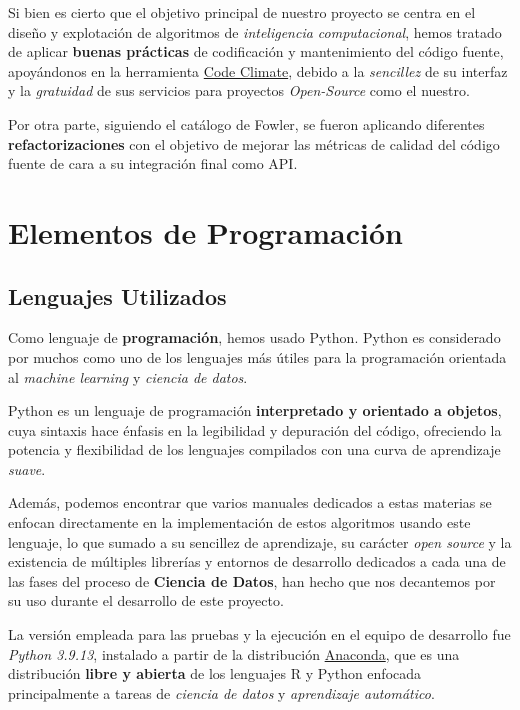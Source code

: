 Si bien es cierto que el objetivo principal de nuestro proyecto se centra en el diseño y explotación de algoritmos de \textit{inteligencia computacional}, hemos tratado de aplicar \textbf{buenas prácticas} de codificación y mantenimiento del código fuente, apoyándonos en la herramienta \href{https://codeclimate.com/github/jesgararm/GestorQuirofanos}{Code Climate}, debido a la \textit{sencillez} de su interfaz y la \textit{gratuidad} de sus servicios para proyectos \textit{Open-Source} como el nuestro.

Por otra parte, siguiendo el catálogo de Fowler\cite{Fowler1999Refactoring:Code}, se fueron aplicando diferentes \textbf{refactorizaciones} con el objetivo de mejorar las métricas de calidad del código fuente de cara a su integración final como API.


\section{Elementos de Programación}

\subsection{Lenguajes Utilizados}

Como lenguaje de \textbf{programación}, hemos usado Python\cite{VanRossum2009PythonManual}. Python es considerado por muchos como uno de los lenguajes más útiles para la programación orientada al \textit{machine learning} y \textit{ciencia de datos}. 

Python es un lenguaje de programación \textbf{interpretado y orientado a objetos}, cuya sintaxis hace énfasis en la legibilidad y depuración del código, ofreciendo la potencia y flexibilidad de los lenguajes compilados con una curva de aprendizaje \textit{suave}.\cite{2021Scikit-LearnPython} 

Además, podemos encontrar que varios manuales dedicados a estas materias\cite{VanderPlas2016PythonData} se enfocan directamente en la implementación de estos algoritmos usando este lenguaje, lo que sumado a su sencillez de aprendizaje, su carácter \textit{open source} y la existencia de múltiples librerías y entornos de desarrollo dedicados a cada una de las fases del proceso de \textbf{Ciencia de Datos}, han hecho que nos decantemos por su uso durante el desarrollo de este proyecto.

La versión empleada para las pruebas y la ejecución en el equipo de desarrollo fue \textit{Python 3.9.13}, instalado a partir de la distribución \href{https://www.anaconda.com/}{Anaconda}, que es una distribución \textbf{libre y abierta} de los lenguajes R y Python enfocada principalmente a tareas de \textit{ciencia de datos} y \textit{aprendizaje automático}.

